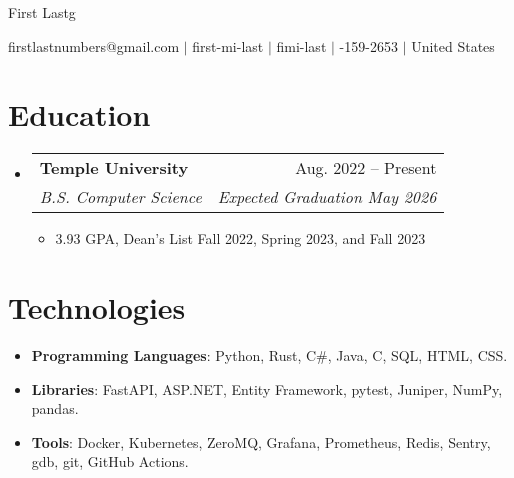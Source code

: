 \documentclass[letterpaper,11pt]{article}
\makeatletter
\newcommand{\resumeItem}[1]{
  \item\small{
    {#1 \vspace{-2pt}}
  }
}
\newcommand{\resumeSubheading}[4]{
  \vspace{-2pt}\item
    \begin{tabular*}{0.97\textwidth}[t]{l@{\extracolsep{\fill}}r}
      \textbf{#1} & #2 \\
      \textit{\small#3} & \textit{\small #4} \\
    \end{tabular*}\vspace{-7pt}
}
\newcommand{\resumeSubItem}[1]{\resumeItem{#1}\vspace{-4pt}}
\newcommand{\resumeSubheadingListStart}{\begin{itemize}[leftmargin=0.15in, label={}]}
\newcommand{\resumeSubheadingListEnd}{\end{itemize}}
\newcommand{\resumeItemListStart}{\begin{itemize}}
\newcommand{\resumeItemListEnd}{\end{itemize}}
\newcommand{\myemail}{firstlastnumbers@gmail.com}
\newcommand{\myname}{First Lastg}
\newcommand{\mygh}{first-mi-last}
\newcommand{\mylinkedin}{fimi-last}
\newcommand{\myphone}{314-159-2653}
\newcommand{\mylocation}{United States}
\newcommand{\myemail}{jonathanzhang929@gmail.com}
\newcommand{\myname}{Jonathan Zhang}
\newcommand{\mygh}{jonathan-d-zhang}
\newcommand{\mylinkedin}{jd-zhang}
\newcommand{\myphone}{484-986-8012}
\newcommand{\mylocation}{Philadelphia, PA}
\makeatother
\begin{document}
{\Huge \myname}
\\
\vspace{2pt}

\small{
    \faEnvelope
    \thinspace \thinspace
    \myemail
    \thinspace \thinspace $|$
    \faGithub
    \thinspace \thinspace
    \mygh
    \thinspace \thinspace $|$
    \faLinkedin
    \thinspace \thinspace
    \mylinkedin
    \thinspace \thinspace $|$
    \faPhone
    \thinspace \thinspace
    \myphone
    \thinspace \thinspace $|$
    \thinspace \thinspace
    \mylocation
}

\vspace{-11pt}

\section{Education}
  \resumeSubheadingListStart
    \resumeSubheading{Temple University}{Aug. 2022 -- Present}{B.S. Computer Science}{Expected Graduation May 2026}
    \resumeItemListStart
        \resumeItem{3.93 GPA, Dean's List Fall 2022, Spring 2023, and Fall 2023}
    \resumeItemListEnd
  \resumeSubheadingListEnd

\section{Technologies}
\resumeSubheadingListStart
    \resumeSubItem{\textbf{Programming Languages}{:
        Python,
        Rust,
        C\#,
        Java,
        C,
        SQL,
        HTML,
        CSS.
    }} \\
    \resumeSubItem{\textbf{Libraries}{:
        FastAPI,
        ASP.NET,
        Entity Framework,
        pytest,
        Juniper,
        NumPy,
        pandas.
    }} \\
    \resumeSubItem{\textbf{Tools}{:
        Docker,
        Kubernetes,
        ZeroMQ,
        Grafana,
        Prometheus,
        Redis,
        Sentry,
        gdb,
        git,
        GitHub Actions.
    }}
\resumeSubheadingListEnd
\end{document}
